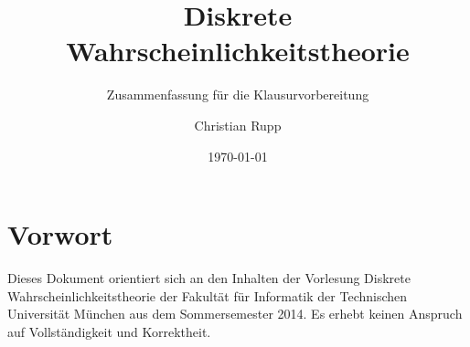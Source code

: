\documentclass[a4,12pt]{scrartcl}
\title{Diskrete Wahrscheinlichkeitstheorie}
\subtitle{Zusammenfassung für die Klausurvorbereitung}
\author{Christian Rupp}
\date{\today}
\begin{document}
\maketitle

\newpage

\tableofcontents

\section{Vorwort}

Dieses Dokument orientiert sich an den Inhalten der Vorlesung Diskrete Wahrscheinlichkeitstheorie der Fakultät für Informatik der Technischen Universität München aus dem Sommersemester 2014.
Es erhebt keinen Anspruch auf Vollständigkeit und Korrektheit.



\end{document}
